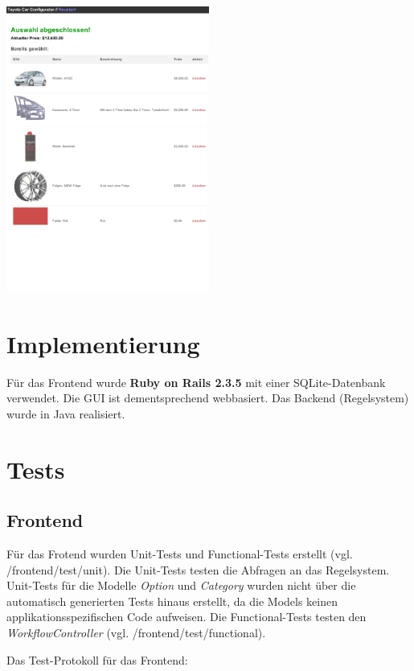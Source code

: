 \documentclass[a4paper,10pt]{article}
\begin{document}
\\
\includegraphics[width=0.5\textwidth]{screenshots/screenshot7.eps}

\section{Implementierung}

Für das Frontend wurde \textbf{Ruby on Rails 2.3.5} mit einer SQLite-Datenbank verwendet.
Die GUI ist dementsprechend webbasiert.
Das Backend (Regelsystem) wurde in Java realisiert. 

\section{Tests}

\subsection{Frontend}

Für das Frotend wurden Unit-Tests und Functional-Tests erstellt (vgl. /frontend/test/unit).
Die Unit-Tests testen die Abfragen an das Regelsystem.
Unit-Tests für die Modelle \textit{Option} und \textit{Category} wurden nicht über die automatisch generierten Tests hinaus erstellt, da die Models keinen applikationsspezifischen Code aufweisen.
Die Functional-Tests testen den \textit{WorkflowController} (vgl. /frontend/test/functional).

Das Test-Protokoll für das Frontend:
\end{document}
